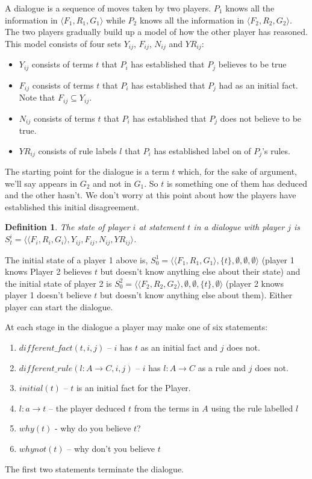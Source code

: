 \documentclass{blue-book}
\newtheorem{definition}{Definition}
\newcommand{\drule}[3]{\ensuremath{#1:#2 \rightarrow #3}}
\begin{document}
A dialogue is a sequence of moves taken by two players.  $P_1$ knows all the information in $\langle F_1, R_1, G_1\rangle$ while $P_2$ knows all the information in $\langle F_2, R_2, G_2\rangle$.  The two players gradually build up a model of how the other player has reasoned.  This model consists of four sets $Y_{ij}$, $F_{ij}$, $N_{ij}$ and $YR_{ij}$:
\begin{itemize}
\item $Y_{ij}$ consists of terms $t$ that $P_i$ has established that $P_j$ believes to be true
\item $F_{ij}$ consists of terms $t$ that $P_i$ has established that $P_j$ had as an initial fact.  Note that $F_{ij} 
\subseteq Y_{ij}$.
\item$N_{ij}$ consists of terms $t$ that $P_i$ has established that $P_j$ does not believe to be true.
\item $YR_{ij}$ consists of rule labels $l$ that $P_i$ has established label on of $P_j$'s rules. 
\end{itemize}


The starting point for the dialogue is a term $t$ which, for the sake of argument, we'll say appears in $G_2$ and not in $G_1$.  So $t$ is something one of them has deduced and the other hasn't.  We don't worry at this point about how the players have established this initial disagreement.

\begin{definition}
The state of player $i$ at statement $t$ in a dialogue with player $j$ is $S^i_t = \langle \langle F_i, R_i, G_i \rangle, Y_{ij}, F_{ij}, N_{ij}, YR_{ij} \rangle$.  
\end{definition}

The initial state of a player 1 above is, $S^1_0 = \langle \langle F_1, R_1, G_1 \rangle, \{t\}, \emptyset, \emptyset, \emptyset \rangle$ (player 1 knows Player 2 believes $t$ but doesn't know anything else about their state) and the initial state of player 2 is $S^2_0 = \langle \langle F_2, R_2, G_2 \rangle, \emptyset, \emptyset, \{t\}, \emptyset \rangle$ (player 2 knows player 1 doesn't believe $t$ but doesn't know anything else about them).  Either player can start the dialogue.


At each stage in the dialogue a player may make one of six statements:  
\begin{enumerate}
\item $\mathit{different\_fact(t, i, j)}$ -- $i$ has $t$ as an initial fact and $j$ does not.
\item $\mathit{different\_rule(\drule{l}{A}{C}, i, j)}$ -- $i$ has $\drule{l}{A}{C}$ as a rule and $j$ does not.
\item $initial(t)$ -- $t$ is an initial fact for the Player.
\item $\drule{l}{a}{t}$ -- the player deduced $t$ from the terms in $A$ using the rule labelled $l$
\item $why(t)$ - why do you believe $t$?
\item $whynot(t)$ -- why don't you believe $t$
\end{enumerate}
The first two statements terminate the dialogue.
\end{document}
